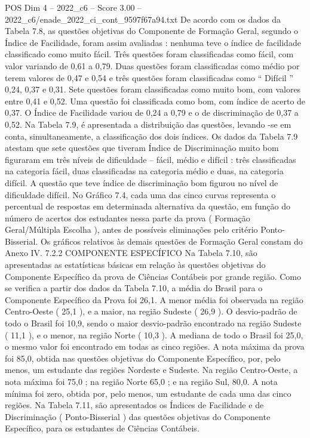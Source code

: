 \begin{textsample}{POS Dim 4 – 2022\_c6 – Score 3.00 – 2022\_c6/enade\_2022\_ci\_cont\_9597f67a94.txt}
De acordo com os dados da Tabela 7.8, as questões objetivas do Componente de Formação Geral, segundo o Índice de Facilidade, foram assim avaliadas : nenhuma teve o índice de facilidade classificado como muito fácil.
Três questões foram classificadas como fácil, com valor variando de 0,61 a 0,79.
Duas questões foram classificadas como médio por terem valores de 0,47 e 0,54 e três questões foram classificadas como “ Difícil ” 0,24, 0,37 e 0,31.
Sete questões foram classificadas como muito bom, com valores entre 0,41 e 0,52.
Uma questão foi classificada como bom, com índice de acerto de 0,37.
O Índice de Facilidade variou de 0,24 a 0,79 e o de discriminação de 0,37 a 0,52.
Na Tabela 7.9, é apresentada a distribuição das questões, levando -se em conta, simultaneamente, a classificação dos dois índices.
Os dados da Tabela 7.9 atestam que sete questões que tiveram Índice de Discriminação muito bom figuraram em três níveis de dificuldade – fácil, médio e difícil : três classificadas na categoria fácil, duas classificadas na categoria médio e duas, na categoria difícil.
A questão que teve índice de discriminação bom figurou no nível de dificuldade difícil.
No Gráfico 7.4, cada uma das cinco curvas representa o percentual de respostas em determinada alternativa da questão, em função do número de acertos dos estudantes nessa parte da prova ( Formação Geral/Múltipla Escolha ), antes de possíveis eliminações pelo critério Ponto-Bisserial.
Os gráficos relativos às demais questões de Formação Geral constam do Anexo IV. 7.2.2 COMPONENTE ESPECÍFICO Na Tabela 7.10, são apresentadas as estatísticas básicas em relação às questões objetivas do Componente Específico da prova de Ciências Contábeis por grande região.
Como se verifica a partir dos dados da Tabela 7.10, a média do Brasil para o Componente Específico da Prova foi 26,1.
A menor média foi observada na região Centro-Oeste ( 25,1 ), e a maior, na região Sudeste ( 26,9 ).
O desvio-padrão de todo o Brasil foi 10,9, sendo o maior desvio-padrão encontrado na região Sudeste ( 11,1 ), e o menor, na região Norte ( 10,3 ).
A mediana de todo o Brasil foi 25,0, o mesmo valor foi encontrado em todas as cinco regiões.
A nota máxima da prova foi 85,0, obtida nas questões objetivas do Componente Específico, por, pelo menos, um estudante das regiões Nordeste e Sudeste.
Na região Centro-Oeste, a nota máxima foi 75,0 ; na região Norte 65,0 ; e na região Sul, 80,0.
A nota mínima foi zero, obtida por, pelo menos, um estudante de cada uma das cinco regiões.
Na Tabela 7.11, são apresentados os Índices de Facilidade e de Discriminação ( Ponto-Bisserial ) das questões objetivas do Componente Específico, para os estudantes de Ciências Contábeis.

\end{textsample}
